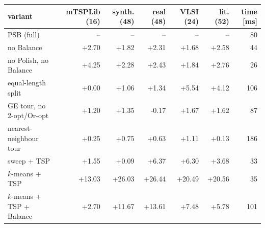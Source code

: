 \begin{tabular}{lrrrrrr}
\toprule
variant & mTSPLib (16) & synth. (48) & real (48) & VLSI (24) & lit. (52) & time [ms] \\
\midrule
PSB (full) & -- & -- & -- & -- & -- & 80 \\
no Balance & +2.70 & +1.82 & +2.31 & +1.68 & +2.58 & 44 \\
no Polish, no Balance & +4.25 & +2.28 & +2.43 & +1.84 & +2.76 & 26 \\
equal-length split & +0.00 & +1.06 & +1.34 & +5.54 & +4.12 & 106 \\
GE tour, no 2-opt/Or-opt & +1.20 & +1.35 & -0.17 & +1.67 & +1.62 & 87 \\
nearest-neighbour tour & +0.25 & +0.75 & +0.63 & +1.11 & +0.13 & 186 \\
sweep + TSP & +1.55 & +0.09 & +6.37 & +6.30 & +3.68 & 33 \\
$k$-means + TSP & +13.03 & +26.03 & +26.44 & +20.49 & +20.56 & 35 \\
$k$-means + TSP + Balance & +2.70 & +11.67 & +13.61 & +7.48 & +5.78 & 101 \\
\bottomrule
\end{tabular}
